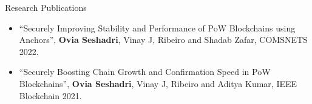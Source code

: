 \documentclass{resume} %
\begin{document}
\begin{rSection}{Research Publications}
\begin{itemize}
	\item “Securely Improving Stability and Performance of PoW Blockchains using Anchors”, \textbf{Ovia Seshadri}, Vinay J, Ribeiro and Shadab Zafar, COMSNETS 2022.
	


\item “Securely Boosting Chain Growth and Confirmation Speed in PoW Blockchains”, \textbf{Ovia Seshadri}, Vinay J, Ribeiro and Aditya Kumar, IEEE Blockchain 2021.


\end{itemize}
\end{rSection}
\end{document}

